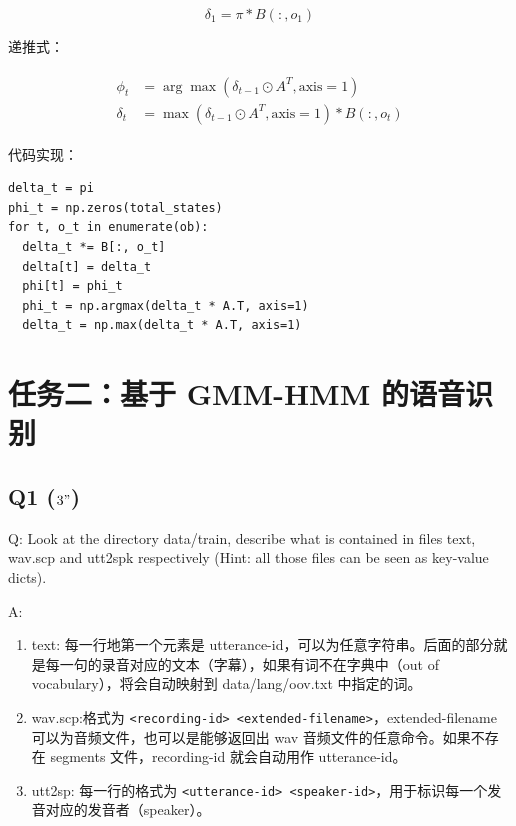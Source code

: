 \documentclass[degree=project,degree-type=project,cjk-font=noto]{thuthesis}
\begin{document}
\begin{equation}
  \delta_1 = \pi * B(:, o_1)
\end{equation}

递推式：

\begin{align}
  \begin{split}
    \phi_t &= \arg \max(\delta_{t-1} \odot A^T, \text{axis}=1) \\
    \delta_t &= \max(\delta_{t-1} \odot A^T, \text{axis}=1) * B(:, o_t)
  \end{split}
\end{align}

代码实现：

  \begin{verbatim}
delta_t = pi
phi_t = np.zeros(total_states)
for t, o_t in enumerate(ob):
  delta_t *= B[:, o_t]
  delta[t] = delta_t
  phi[t] = phi_t
  phi_t = np.argmax(delta_t * A.T, axis=1)
  delta_t = np.max(delta_t * A.T, axis=1)
  \end{verbatim}

\chapter{任务二：基于 GMM-HMM 的语音识别}

\section{Q1 ($3"$)}

Q: Look at the directory data/train, describe what is contained in files text, wav.scp and utt2spk respectively (Hint: all those files can be seen as key-value dicts).

A:

\begin{enumerate}
  \item text: 每一行地第一个元素是 utterance-id，可以为任意字符串。后面的部分就是每一句的录音对应的文本（字幕），如果有词不在字典中（out of vocabulary），将会自动映射到 data/lang/oov.txt 中指定的词。
  \item wav.scp:格式为 \texttt{<recording-id> <extended-filename>}，extended-filename 可以为音频文件，也可以是能够返回出 wav 音频文件的任意命令。如果不存在 segments 文件，recording-id 就会自动用作 utterance-id。
  \item utt2sp: 每一行的格式为 \texttt{<utterance-id> <speaker-id>}，用于标识每一个发音对应的发音者（speaker）。
\end{enumerate}
\end{document}
